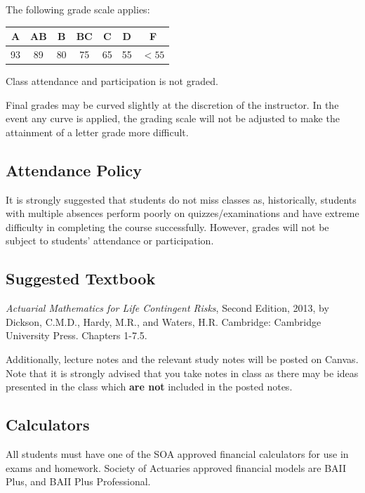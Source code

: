\documentclass[11pt,fleqn,oneside]{book}
\begin{document}
The following grade scale applies:
\begin{center}
\begin{tabular}{ | c | c | c | c | c | c | c |}
\hline
 \textbf{ A } & \textbf{ AB} & \textbf{ B} & \textbf{ BC} & \textbf{ C} & \textbf{ D } & \textbf{ F } \\    
\hline
 93 & 89 & 80 & 75 & 65 & 55 & $<55$ \\
\hline  
\end{tabular}
\end{center}

Class attendance and participation is not graded.

Final grades may be curved slightly at the discretion of the instructor. In the event any curve is applied, the grading scale will not be adjusted to make the attainment of a letter grade more difficult.

\subsection*{Attendance Policy}
It is strongly suggested that students do not miss classes as, historically, students with multiple absences perform poorly on quizzes/examinations and have extreme difficulty in completing the course successfully. However, grades will not be subject to students' attendance or participation.

\subsection*{Suggested Textbook}

\textit{Actuarial Mathematics for Life Contingent Risks}, Second Edition, 2013, by Dickson, C.M.D., Hardy, M.R., and Waters, H.R. Cambridge: Cambridge University Press. Chapters 1-7.5.

Additionally, lecture notes and the relevant study notes will be posted on Canvas. Note that it is strongly advised that you take notes in class as there may be ideas presented in the class which \textbf{are not} included in the posted notes.

\subsection*{Calculators}

All students must have one of the SOA approved financial calculators for use in exams and homework. Society of Actuaries approved financial models are BAII Plus, and BAII Plus Professional.
\end{document}
